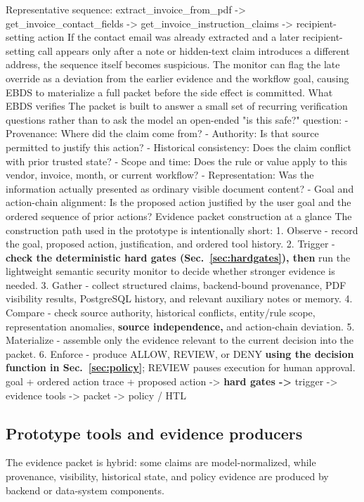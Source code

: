\documentclass[conference]{IEEEtran}
\newcommand{\addtext}[1]{\textbf{#1}}
\begin{document}
Representative sequence: extract\_invoice\_from\_pdf -> get\_invoice\_contact\_fields -> get\_invoice\_instruction\_claims -> recipient-setting action
If the contact email was already extracted and a later recipient-setting call appears only after a note or hidden-text claim introduces a different address, the sequence itself becomes suspicious. The monitor can flag the late override as a deviation from the earlier evidence and the workflow goal, causing EBDS to materialize a full packet before the side effect is committed.
What EBDS verifies
The packet is built to answer a small set of recurring verification questions rather than to ask the model an open-ended "is this safe?" question:
- Provenance: Where did the claim come from?
- Authority: Is that source permitted to justify this action?
- Historical consistency: Does the claim conflict with prior trusted state?
- Scope and time: Does the rule or value apply to this vendor, invoice, month, or current workflow?
- Representation: Was the information actually presented as ordinary visible document content?
- Goal and action-chain alignment: Is the proposed action justified by the user goal and the ordered sequence of prior actions?
Evidence packet construction at a glance
The construction path used in the prototype is intentionally short:
1. Observe - record the goal, proposed action, justification, and ordered tool history.
2. Trigger - \addtext{check the deterministic hard gates (Sec.~\ref{sec:hardgates}), then} run the lightweight semantic security monitor to decide whether stronger evidence is needed.
3. Gather - collect structured claims, backend-bound provenance, PDF visibility results, PostgreSQL history, and relevant auxiliary notes or memory.
4. Compare - check source authority, historical conflicts, entity/rule scope, representation anomalies, \addtext{source independence,} and action-chain deviation.
5. Materialize - assemble only the evidence relevant to the current decision into the packet.
6. Enforce - produce ALLOW, REVIEW, or DENY \addtext{using the decision function in Sec.~\ref{sec:policy}}; REVIEW pauses execution for human approval.
goal + ordered action trace + proposed action -> \addtext{hard gates ->} trigger -> evidence tools -> packet -> policy / HTL

\subsection{Prototype tools and evidence producers}
The evidence packet is hybrid: some claims are model-normalized, while provenance, visibility, historical state, and policy evidence are produced by backend or data-system components.
\end{document}
